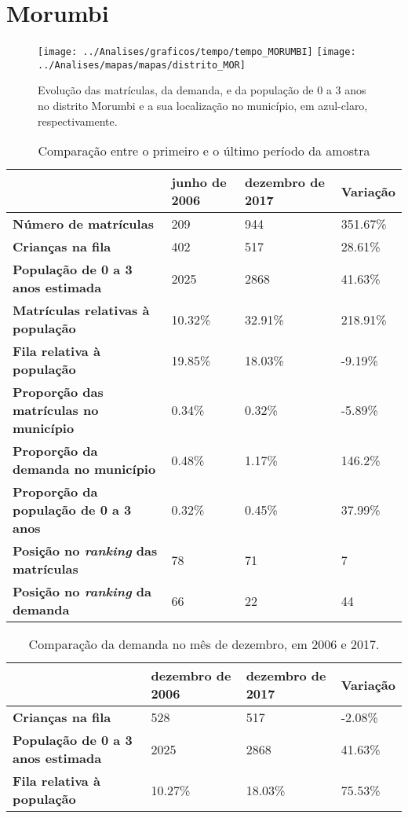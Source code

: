 \section{Morumbi}
\begin{figure}[H]
\centering
\texttt{[image: ../Analises/graficos/tempo/tempo\_MORUMBI]}
\texttt{[image: ../Analises/mapas/mapas/distrito\_MOR]}
\caption{Evolução das matrículas, da demanda, e da população de 0 a 3 anos no distrito Morumbi e a sua localização no município, em azul-claro, respectivamente.}
\end{figure}
\begin{table}[H]
\begin{tabular}{l|l|l|l}
\textbf{}                                      & \textbf{junho de 2006}       & \textbf{dezembro de 2017}    & \textbf{Variação} \\ \hline
\textbf{Número de matrículas}                  & 209 & 944 & 351.67\% \\ \hline
\textbf{Crianças na fila}                      & 402 & 517 & 28.61\% \\ \hline
\textbf{População de 0 a 3 anos estimada}      & 2025 & 2868 & 41.63\% \\ \hline
\textbf{Matrículas relativas à população}      & 10.32\% & 32.91\% & 218.91\% \\ \hline
\textbf{Fila relativa à população}             & 19.85\% & 18.03\% & -9.19\% \\ \hline
\textbf{Proporção das matrículas no município} & 0.34\% & 0.32\% & -5.89\% \\ \hline
\textbf{Proporção da demanda no município}     & 0.48\% & 1.17\% & 146.2\% \\ \hline
\textbf{Proporção da população de 0 a 3 anos}  & 0.32\% & 0.45\% & 37.99\% \\ \hline
\textbf{Posição no \textit{ranking} das matrículas}     & 78 & 71 & 7 \\ \hline
\textbf{Posição no \textit{ranking} da demanda}         & 66 & 22 & 44 \\ 
\end{tabular}
\caption{Comparação entre o primeiro e o último período da amostra}
\end{table}
\begin{table}[H]
\begin{tabular}{l|l|l|l}
\textbf{}                                 & \textbf{dezembro de 2006} & \textbf{dezembro de 2017} & \textbf{Variação} \\ \hline
\textbf{Crianças na fila}                      & 528 & 517 & -2.08\% \\ \hline
\textbf{População de 0 a 3 anos estimada}      & 2025 & 2868 & 41.63\% \\ \hline
\textbf{Fila relativa à população}             & 10.27\% & 18.03\% & 75.53\% \\
\end{tabular}
\caption{Comparação da demanda no mês de dezembro, em 2006 e 2017.}
\end{table}
